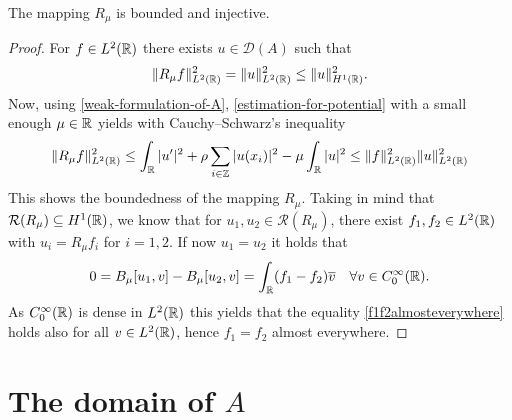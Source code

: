 \begin{theorem} \label{rmuinj}
	The mapping $R_{\mu}$ is bounded and injective.
	
	\begin{proof}
		For $f \in L^{2}(\mathbb{R})$ there exists $u \in \mathcal{D}(A)$ such that
		\[ \| R_{\mu} f \|_{L^{2}(\mathbb{R})}^{2} = \| u \|_{L^{2}(\mathbb{R})}^{2} \leq \| u \|_{H^{1}(\mathbb{R})}^{2}. \] 
		Now, using \eqref{weak-formulation-of-A}, \eqref{estimation-for-potential} with a small enough $\mu \in \mathbb{R}$ yields with Cauchy–Schwarz's inequality
		\[ \| R_{\mu} f \|_{L^{2}(\mathbb{R})}^{2} \leq \int_{\mathbb{R}} |u'|^{2} + \rho \sum_{i \in \mathbb{Z}} |u(x_{i})|^{2} - \mu \int_{\mathbb{R}} |u|^{2} \leq \| f \|_{L^{2}(\mathbb{R})}^{2} \| u \|_{L^{2}(\mathbb{R})}^{2} \]	
		This shows the boundedness of the mapping $R_{\mu}$. Taking in mind that $\mathcal{R}(R_{\mu}) \subseteq H^{1}(\mathbb{R})$, we know that for $u_{1}, u_{2} \in \mathcal{R}(R_{\mu})$, there exist $f_{1}, f_{2} \in L^{2}(\mathbb{R})$ with $u_{i} = R_{\mu} f_{i}$ for $i = 1, 2$. If now $u_{1} = u_{2}$ it holds that
		\begin{equation}
			0 = B_{\mu}[u_{1}, v] - B_{\mu}[u_{2}, v]= \int_{\mathbb{R}} (f_{1} - f_{2}) \overline{v} \quad \forall v \in C_{0}^{\infty}(\mathbb{R}). \label{f1f2almosteverywhere}
		\end{equation} 
		As $C_{0}^{\infty}(\mathbb{R})$ is dense in $L^{2}(\mathbb{R})$ this yields that the equality \eqref{f1f2almosteverywhere} holds also for all $v \in L^{2}(\mathbb{R})$, hence $f_{1} = f_{2}$ almost everywhere.
	\end{proof}
\end{theorem}

\section{The domain of $A$} \label{chap-2.2}

